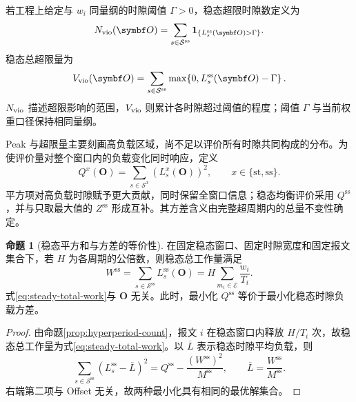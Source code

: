 \documentclass[UTF8,a4paper,twoside,zihao=-4]{ctexart}
\numberwithin{equation}{section}
\numberwithin{figure}{section}
\numberwithin{table}{section}
\theoremstyle{definition}
\newtheorem{proposition}{命题}
\newcommand{\ind}[1]{\mathbf{1}_{\{#1\}}}
\newcommand{\Sset}{\mathcal{S}}
\newcommand{\Eset}{\mathcal{E}}
\numberwithin{algocf}{section}
\begin{document}
若工程上给定与 $w_i$ 同量纲的时隙阈值 $\Gamma>0$，稳态超限时隙数定义为
\begin{equation}
 N_{\rm vio}(\symbf O)
 =\sum_{s\in\Sset^{\mathrm{ss}}}
 \ind{L_s^{\mathrm{ss}}(\symbf O)>\Gamma}.
\label{eq:violation-metrics}
\end{equation}
稳态总超限量为
\begin{equation}
 V_{\rm vio}(\symbf O)
 =\sum_{s\in\Sset^{\mathrm{ss}}}
 \max\!\left\{0,L_s^{\mathrm{ss}}(\symbf O)-\Gamma\right\}.
\label{eq:violation-amount}
\end{equation}
$N_{\rm vio}$ 描述超限影响的范围，$V_{\rm vio}$ 则累计各时隙超过阈值的程度；阈值 $\Gamma$ 与当前权重口径保持相同量纲。

Peak 与超限量主要刻画高负载区域，尚不足以评价所有时隙共同构成的分布。为使评价量对整个窗口内的负载变化同时响应，定义
\begin{equation}
 Q^{x}(\symbf O)
 =\sum_{s\in\Sset^{x}}
 \left(L_s^{x}(\symbf O)\right)^2,
 \qquad x\in\{\mathrm{st},\mathrm{ss}\}.
\label{eq:phase-load-square}
\end{equation}
平方项对高负载时隙赋予更大贡献，同时保留全窗口信息；稳态均衡评价采用 $Q^{\mathrm{ss}}$，并与只取最大值的 $Z^{\mathrm{ss}}$ 形成互补。其方差含义由完整超周期内的总量不变性确定。

\begin{proposition}[稳态平方和与方差的等价性]
\label{prop:qss-variance}
在固定稳态窗口、固定时隙宽度和固定报文集合下，若 $H$ 为各周期的公倍数，则稳态总工作量满足
\begin{equation}
 W^{\mathrm{ss}}
 =\sum_{s\in\Sset^{\mathrm{ss}}}L_s^{\mathrm{ss}}(\symbf O)
 =H\sum_{m_i\in\Eset}\frac{w_i}{T_i}.
\label{eq:steady-total-work}
\end{equation}
式\eqref{eq:steady-total-work}与 $\symbf O$ 无关。此时，最小化 $Q^{\mathrm{ss}}$ 等价于最小化稳态时隙负载方差。
\end{proposition}

\begin{proof}
由命题\ref{prop:hyperperiod-count}，报文 $i$ 在稳态窗口内释放 $H/T_i$ 次，故稳态总工作量为式\eqref{eq:steady-total-work}。以 $\overline L$ 表示稳态时隙平均负载，则
\begin{equation}
 \sum_{s\in\Sset^{\mathrm{ss}}}
 \left(L_s^{\mathrm{ss}}-\overline L\right)^2
 =Q^{\mathrm{ss}}
 -\frac{\left(W^{\mathrm{ss}}\right)^2}{M^{\mathrm{ss}}},
 \qquad
 \overline L=\frac{W^{\mathrm{ss}}}{M^{\mathrm{ss}}}.
\label{eq:qss-variance-identity}
\end{equation}
右端第二项与 Offset 无关，故两种最小化具有相同的最优解集合。
\end{proof}
\end{document}
